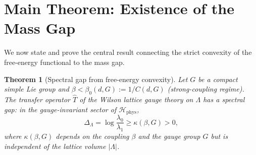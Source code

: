 \documentclass[12pt,a4paper]{article}
\theoremstyle{definition}
\theoremstyle{plain}
\newtheorem{theorem}[definition]{Theorem}
\theoremstyle{remark}
\begin{document}
\section{Main Theorem: Existence of the Mass Gap}

We now state and prove the central result connecting the strict convexity of the free-energy functional to the mass gap.

\begin{theorem}[Spectral gap from free-energy convexity]
\label{thm:lattice-gap}
Let $G$ be a compact simple Lie group and $\beta < \beta_0(d,G) := 1/C(d,G)$ (strong-coupling regime). The transfer operator $\hat{T}$ of the Wilson lattice gauge theory on $\Lambda$ has a spectral gap: in the gauge-invariant sector of $\mathcal{H}_{\mathrm{phys}}$,
\begin{equation}
    \Delta_\Lambda = \log \frac{\lambda_0}{\lambda_1} \geq \kappa(\beta, G) > 0,
\end{equation}
where $\kappa(\beta, G)$ depends on the coupling $\beta$ and the gauge group $G$ but is independent of the lattice volume $|\Lambda|$.
\end{theorem}
\end{document}
